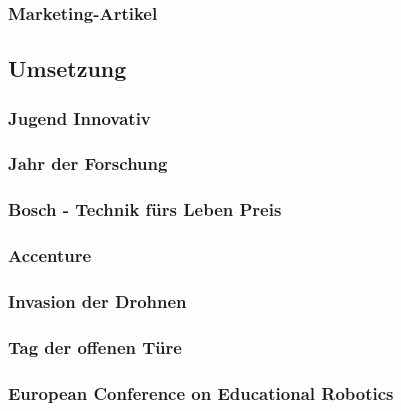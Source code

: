     \subsubsection{Marketing-Artikel}

  \subsection{Umsetzung}

    \subsubsection{Jugend Innovativ}

    \subsubsection{Jahr der Forschung}

    \subsubsection{Bosch - Technik fürs Leben Preis}

    \subsubsection{Accenture}

    \subsubsection{Invasion der Drohnen}

    \subsubsection{Tag der offenen Türe}

    \subsubsection{European Conference on Educational Robotics}
